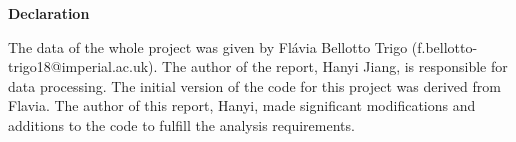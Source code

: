\begin{center}
    \fontsize{20pt}{25pt}\selectfont
    \textbf{Declaration}
\end{center}
\vspace{1.5cm}




The data of the whole project was given by Flávia Bellotto Trigo (f.bellotto-trigo18@imperial.ac.uk). The author of the report, Hanyi Jiang, is responsible for data processing. The initial version of the code for this project was derived from Flavia. The author of this report, Hanyi, made significant modifications and additions to the code to fulfill the analysis requirements. 


